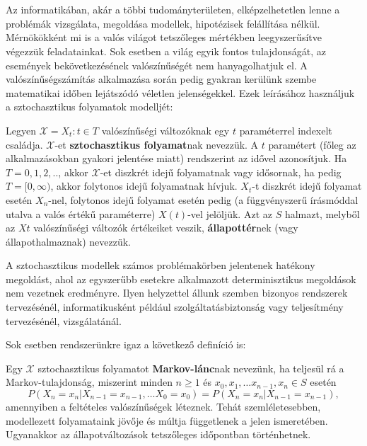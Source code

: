 \chapter{\bevezetes}

Az informatikában, akár a többi tudományterületen, elképzelhetetlen lenne a problémák vizsgálata, megoldása modellek, hipotézisek felállítása nélkül. Mérnökökként mi is a valós világot tetszőleges mértékben leegyszerűsítve végezzük feladatainkat. Sok esetben a világ egyik fontos tulajdonságát, az események bekövetkezésének valószínűségét nem hanyagolhatjuk el. A valószínűségszámítás alkalmazása során pedig gyakran kerülünk szembe matematikai időben lejátszódó véletlen jelenségekkel. Ezek leírásához használjuk a sztochasztikus folyamatok modelljét:

\begin{definition}
	Legyen $\mathcal{X}={X_t:t \in T}$ valószínűségi változóknak egy $t$ paraméterrel indexelt családja. $\mathcal{X}$-et \textbf{sztochasztikus folyamat}nak nevezzük. A $t$ paramétert (főleg az alkalmazásokban gyakori jelentése miatt) rendszerint az idővel azonosítjuk. Ha $T = {0,1,2,..}$, akkor $\mathcal{X}$-et diszkrét idejű folyamatnak vagy idősornak, ha pedig $T=[0,\infty)$, akkor folytonos idejű folyamatnak hívjuk. $X_t$-t diszkrét idejű folyamat esetén $X_n$-nel, folytonos idejű folyamat esetén pedig (a függvényszerű írásmóddal utalva a valós értékű paraméterre) $X(t)$-vel jelöljük. Azt az $S$ halmazt, melyből az $Xt$ valószínűségi változók értékeiket veszik, \textbf{állapottér}nek (vagy állapothalmaznak) nevezzük.
\end{definition}

A sztochasztikus modellek számos problémakörben jelentenek hatékony megoldást, ahol az egyszerűbb esetekre alkalmazott determinisztikus megoldások nem vezetnek eredményre.
Ilyen helyzettel állunk szemben bizonyos rendszerek tervezésénél, informatikusként például szolgáltatásbiztonság vagy teljesítmény tervezésénél, vizsgálatánál.

Sok esetben rendszerünkre igaz a következő definíció is:

\begin{definition}
	Egy $\mathcal{X}$ sztochasztikus folyamatot \textbf{Markov-lánc}nak nevezünk, ha teljesül rá a Markov-tulajdonság, miszerint minden $n\ge1$ és $x_0,x_1,\dots x_{n-1},x_n\in S$ esetén
	$$P(X_n=x_n|X_{n-1}=x_{n-1},\dots X_0=x_0) = P(X_n=x_n|X_{n-1}=x_{n-1}),$$
	amennyiben a feltételes valószínűségek léteznek.\cite{MarkovLancokKonyv}
	Tehát szemléletesebben, modellezett folyamataink jövője és múltja függetlenek a jelen ismeretében. Ugyanakkor az állapotváltozások tetszőleges időpontban történhetnek.
\end{definition}

